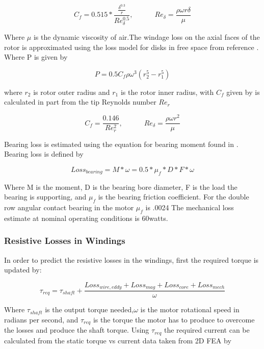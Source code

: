 \documentclass[]{aiaa-tc}%
\begin{document}
\begin{equation}
C_{f}= 0.515*\frac{\frac{\delta^{0.3}}{r}}{Re_{\delta}^{0.5}} , \quad \quad \quad Re_{\delta}=\frac{\rho\omega r \delta}{\mu}
\label{eq:Cf}
\end{equation}

Where $\mu$ is the dynamic viscosity of air.The windage loss on the axial faces of the rotor is approximated using the loss model for disks in free space from reference \cite{Saari}. Where P is given by 

\begin{equation}
P =0.5C_{f}\rho\omega^{3}(r_{2}^{5}-r_{1}^{5})
\label{eq:AxialWindage}
\end{equation}

where $r_{2}$ is rotor outer radius and $r_{1}$ is the rotor inner radius, with $C_{f}$ given by is calculated in part from the tip Reynolds number $Re_{r}$

\begin{equation}
C_{f}= \frac{0.146}{Re_{r}^{2}}, \quad \quad \quad
Re_{\delta}=\frac{\rho\omega r^{2}}{\mu}
\label{eq:Cf2}
\end{equation}

Bearing loss is estimated using the equation for bearing moment found in \cite{Krings}. Bearing loss is defined by

\begin{equation}
Loss_{bearing} = M*\omega = 0.5*\mu_{f}*D*F*\omega
\label{eq:BearingLoss}
\end{equation}

Where M is the moment, D is the bearing bore diameter, F is the load the bearing is supporting, and $\mu_{f}$ is the bearing friction coefficient. For the double row angular contact bearing in the motor $\mu_{f}$ is .0024  The mechanical loss estimate at nominal operating conditions is 60watts.


\subsubsection{Resistive Losses in Windings}
In order to predict the resistive losses in the windings, first the required torque is updated by:

\begin{equation}
\tau_{req} = \tau_{shaft} + \frac{Loss_{wire,eddy} + Loss_{mag} +Loss_{core} +Loss_{mech}}{\omega}
\label{eq:TotalLoss}
\end{equation}

Where $\tau_{shaft}$ is the output torque needed,$\omega$ is the motor rotational speed in radians per second, and $\tau_{req}$ is the torque the motor has to produce to overcome the losses and produce the shaft torque. Using $\tau_{req}$ the required current can be calculated from the static torque vs current data taken from 2D FEA by
\end{document}
